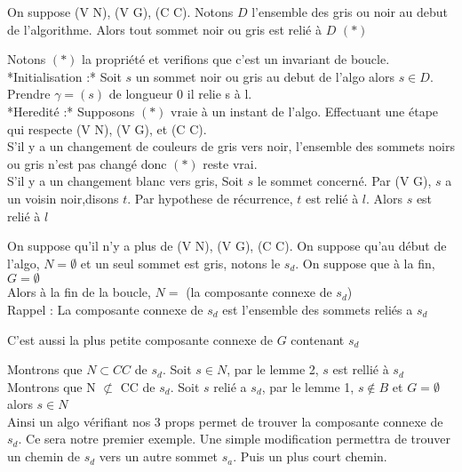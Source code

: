 \begin{lem}
On suppose (V N), (V G), (C C). Notons $D$ l'ensemble des gris ou noir au debut de l'algorithme. Alors tout sommet noir ou gris est relié à $D$  $(*)$  
\end{lem}

\begin{dem}
Notons $(*)$ la propriété et verifions que c'est un invariant de boucle. \\ 
*Initialisation :* Soit $s$ un sommet noir ou gris au debut de l'algo alors $s \in D$. Prendre $\gamma = (s)$ de longueur 0 il relie s à l.  \\
*Heredité :* Supposons $(*)$ vraie à un instant de l'algo. Effectuant une étape qui respecte (V N), (V G), et (C C).  \\
S'il y a un changement de couleurs de gris vers noir, l'ensemble des sommets noirs ou gris n'est pas changé donc $(*)$ reste vrai.  \\
S'il y a un changement blanc vers gris, Soit $s$ le sommet concerné. Par (V G), $s$ a un voisin noir,disons $t$. Par hypothese de récurrence, $t$ est relié à $l$. Alors $s$ est relié à $l$
\end{dem}

\begin{pro}
On suppose qu'il n'y a plus de (V N), (V G), (C C). On suppose qu'au début de l'algo, $N=\emptyset$ et un seul sommet est gris, notons le $s_d$. On suppose que à la fin, $G=\emptyset$  \\
Alors à la fin de la boucle, $N=$ (la composante connexe de $s_d$)  \\
    
Rappel : La composante connexe de  $s_d$ est l'ensemble des sommets reliés a $s_d$  \\
\end{pro}

C'est aussi la plus petite composante connexe de $G$ contenant $s_d$\\

\begin{dem}
Montrons que $N \subset CC$ de $s_d$. Soit $s \in N$, par le lemme 2, $s$ est rellié à $s_d$  \\
Montrons que N $\not\subset$ CC de $s_d$. Soit $s$ relié a $s_d$, par le lemme 1, $s \not\in B$ et $G=\emptyset$ alors $s \in N$  \\

Ainsi un algo vérifiant nos 3 props permet de trouver la composante connexe de $s_d$. Ce sera notre premier exemple. Une simple modification permettra de trouver un chemin de $s_d$ vers un autre sommet $s_a$. Puis un plus court chemin.\\
\end{dem}

